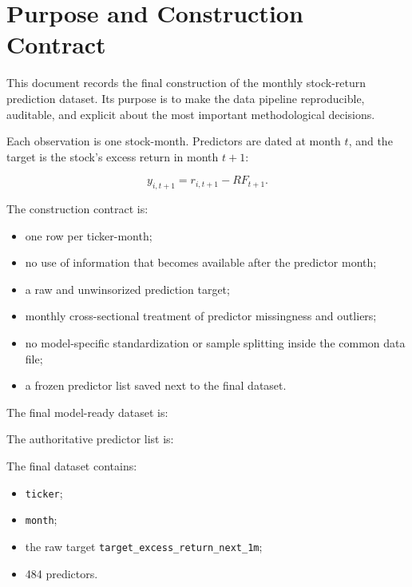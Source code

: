 \documentclass[11pt,a4paper]{article}
\newcommand{\code}[1]{\texttt{#1}}
\newcommand{\target}{\code{target\_excess\_return\_next\_1m}}
\begin{document}

\section{Purpose and Construction Contract}

This document records the final construction of the monthly stock-return
prediction dataset. Its purpose is to make the data pipeline reproducible,
auditable, and explicit about the most important methodological decisions.

Each observation is one stock-month. Predictors are dated at month \(t\), and
the target is the stock's excess return in month \(t+1\):

\[
  y_{i,t+1}=r_{i,t+1}-RF_{t+1}.
\]

The construction contract is:

\begin{itemize}
  \item one row per ticker-month;
  \item no use of information that becomes available after the predictor month;
  \item a raw and unwinsorized prediction target;
  \item monthly cross-sectional treatment of predictor missingness and outliers;
  \item no model-specific standardization or sample splitting inside the common
        data file;
  \item a frozen predictor list saved next to the final dataset.
\end{itemize}

The final model-ready dataset is:

\begin{center}
\end{center}

The authoritative predictor list is:

\begin{center}
\end{center}

The final dataset contains:

\begin{itemize}
  \item \code{ticker};
  \item \code{month};
  \item the raw target \target;
  \item 484 predictors.
\end{itemize}
\end{document}
